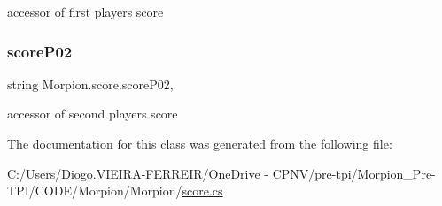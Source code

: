 accessor of first player\textquotesingle{}s score 

\mbox{\label{class_morpion_1_1score_ac4def44f86bf8aa7a8405273428f17cc}} 
\subsubsection{\texorpdfstring{score\+P02}{scoreP02}}
{\footnotesize\ttfamily string Morpion.\+score.\+score\+P02\hspace{0.3cm}{\ttfamily [get]}, {\ttfamily [set]}}



accessor of second player\textquotesingle{}s score 



The documentation for this class was generated from the following file\+:\begin{DoxyCompactItemize}
\item 
C\+:/\+Users/\+Diogo.\+V\+I\+E\+I\+R\+A-\/\+F\+E\+R\+R\+E\+I\+R/\+One\+Drive -\/ C\+P\+N\+V/pre-\/tpi/\+Morpion\+\_\+\+Pre-\/\+T\+P\+I/\+C\+O\+D\+E/\+Morpion/\+Morpion/\hyperlink{score_8cs}{score.\+cs}\end{DoxyCompactItemize}
